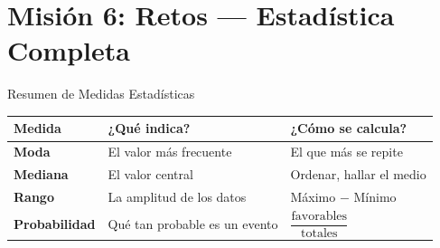\documentclass[12pt, letterpaper]{article}
\begin{document}
	\section*{Misión 6: Retos — Estadística Completa}
	
	\begin{concepto}{Resumen de Medidas Estadísticas}
		\renewcommand{\arraystretch}{1.6}
		\begin{center}
			\begin{tabular}{|m{2.8cm}|m{5cm}|m{4.5cm}|}
				\hline
				\rowcolor{valblue!25}
				\textbf{Medida} & \textbf{¿Qué indica?} & \textbf{¿Cómo se calcula?} \\
				\hline
				\textbf{Moda} &
				El valor más frecuente &
				El que más se repite \\
				\hline
				\textbf{Mediana} &
				El valor central &
				Ordenar, hallar el medio \\
				\hline
				\textbf{Rango} &
				La amplitud de los datos &
				Máximo $-$ Mínimo \\
				\hline
				\textbf{Probabilidad} &
				Qué tan probable es un evento &
				$\dfrac{\text{favorables}}{\text{totales}}$ \\
				\hline
			\end{tabular}
		\end{center}
	\end{concepto}
	
\end{document}
